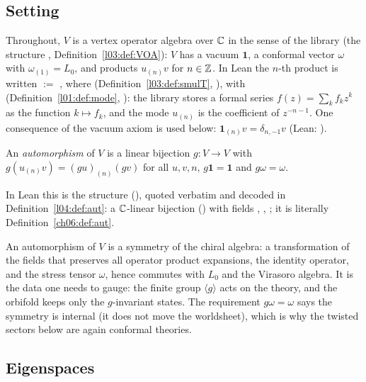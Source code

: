 \subsection{Setting}

Throughout, $V$ is a vertex operator algebra over ${\mathbb{C}}$ in the sense of the library (the structure
, Definition~\ref{l03:def:VOA}): $V$ has a vacuum $\mathbf 1$, a conformal
vector $\omega$ with $\omega_{(1)}=L_0$, and products $u_{(n)}v$ for $n\in{\mathbb{Z}}$.  In Lean the $n$-th
product is written  $:=$ , where
 (Definition~\ref{l03:def:smulT},
), with 
(Definition~\ref{l01:def:mode}, ): the library
stores a formal series $f(z)=\sum_k f_k z^{k}$ as the function $k\mapsto f_k$, and the mode
$u_{(n)}$ is the coefficient of $z^{-n-1}$.  One consequence of the vacuum axiom is used below:
$\mathbf 1_{(n)}v=\delta_{n,-1}v$ (Lean: ).

\begin{definition}[Automorphism]\label{ch06:def:aut}
An \emph{automorphism} of $V$ is a linear bijection $g:V\to V$ with $g(u_{(n)}v)=(gu)_{(n)}(gv)$
for all $u,v,n$, $g\mathbf 1=\mathbf 1$ and $g\omega=\omega$.
\end{definition}
In Lean this is the structure  (), quoted
verbatim and decoded in Definition~\ref{l04:def:aut}: a ${\mathbb{C}}$-linear bijection 
() with fields , , ; it is literally
Definition~\ref{ch06:def:aut}.

\begin{physics}
An automorphism of $V$ is a symmetry of the chiral algebra: a transformation of the fields that preserves all operator product expansions, the identity operator, and the stress tensor $\omega$, hence commutes with $L_0$ and the Virasoro algebra. It is the data one needs to gauge: the finite group $\langle g\rangle$ acts on the theory, and the orbifold keeps only the $g$-invariant states. The requirement $g\omega=\omega$ says the symmetry is internal (it does not move the worldsheet), which is why the twisted sectors below are again conformal theories.
\end{physics}

\subsection{Eigenspaces}

